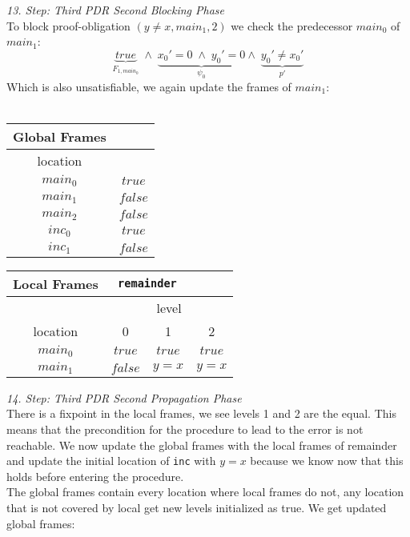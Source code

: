 \documentclass{article}
\begin{document}
	\textsl{13. Step: Third PDR Second Blocking Phase} \\
	To block proof-obligation $(y \neq x, main_1, 2)$ we check the predecessor $main_0$ of $main_1$: \\
	\begin{equation*}
	\underbrace{true}_{F_{1, main_0}}\; \land \; \underbrace{x_0' = 0 \; \land \; y_0' = 0}_{\psi_0} \land \; \underbrace{y_0' \neq x_0'}_{p'}
	\end{equation*}
	Which is also unsatisfiable, we again update the frames of $main_1$: \\ \\
	\begin{minipage}{.4\textwidth}
		\setlength\tabcolsep{0.35em}
		\begin{center}
			\begin{tabu}{cc}
				Global Frames \\
				\toprule
				location &  \\
				$main_0$ & $true$ \\
				$main_1$ & $false$ \\
				$main_2$ & $false$ \\
				$inc_0$ & $true$ \\
				$inc_1$ & $false$\\
				\bottomrule
			\end{tabu}
		\end{center}
	\end{minipage}
	\hfill
	\begin{minipage}{.5\textwidth}
		\setlength\tabcolsep{0.35em}
		\begin{center}
			\begin{tabu}{cccc}
				Local Frames & \multicolumn{2}{c}{\texttt{remainder}} \\
				\toprule
				& \multicolumn{3}{c}{level} \\
				\cmidrule(lr){2-4}
				location & 0 & 1 & 2 \\
				\cmidrule{1-4}
				$main_0$ & $true$ & $true$ & $true$ \\
				$main_1$ & $false$ & $y = x$ & $y = x$\\
				\bottomrule
			\end{tabu}
		\end{center}	
	\end{minipage} 

	\vspace*{2em}

	\textsl{14. Step: Third PDR Second Propagation Phase} \\
	There is a fixpoint in the local frames, we see levels 1 and 2 are the equal.
	This means that the precondition for the procedure to lead to the error is not reachable.
	We now update the global frames with the local frames of remainder and update the initial location of \texttt{inc} with $y = x$ because we know now that this holds before entering the procedure. \\ The global frames contain every location where local frames do not, any location that is not covered by local get new levels initialized as true. We get updated global frames: \\
	
\end{document}
